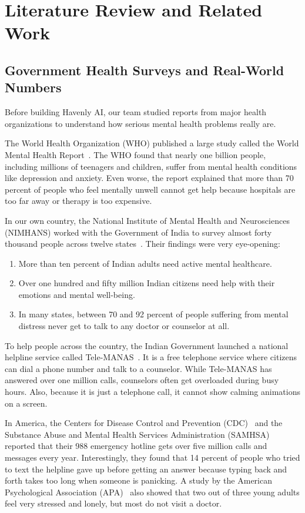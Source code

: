 \chapter{Literature Review and Related Work}
\label{chap:lit_review}

\section{Government Health Surveys and Real-World Numbers}
\label{sec:lit_epidemiological}

Before building Havenly AI, our team studied reports from major health organizations to understand how serious mental health problems really are.

The World Health Organization (WHO) published a large study called the World Mental Health Report~\cite{who2022mentalhealth}. The WHO found that nearly one billion people, including millions of teenagers and children, suffer from mental health conditions like depression and anxiety. Even worse, the report explained that more than 70 percent of people who feel mentally unwell cannot get help because hospitals are too far away or therapy is too expensive.

In our own country, the National Institute of Mental Health and Neurosciences (NIMHANS) worked with the Government of India to survey almost forty thousand people across twelve states~\cite{nimhans2016nmhs}. Their findings were very eye-opening:
\begin{enumerate}
    \item More than ten percent of Indian adults need active mental healthcare.
    \item Over one hundred and fifty million Indian citizens need help with their emotions and mental well-being.
    \item In many states, between 70 and 92 percent of people suffering from mental distress never get to talk to any doctor or counselor at all.
\end{enumerate}

To help people across the country, the Indian Government launched a national helpline service called Tele-MANAS~\cite{telemanas2022guidelines}. It is a free telephone service where citizens can dial a phone number and talk to a counselor. While Tele-MANAS has answered over one million calls, counselors often get overloaded during busy hours. Also, because it is just a telephone call, it cannot show calming animations on a screen.

In America, the Centers for Disease Control and Prevention (CDC)~\cite{cdc2023mentalhealth} and the Substance Abuse and Mental Health Services Administration (SAMHSA)~\cite{samhsa2023report} reported that their 988 emergency hotline gets over five million calls and messages every year. Interestingly, they found that 14 percent of people who tried to text the helpline gave up before getting an answer because typing back and forth takes too long when someone is panicking. A study by the American Psychological Association (APA)~\cite{apa2023stress} also showed that two out of three young adults feel very stressed and lonely, but most do not visit a doctor.

